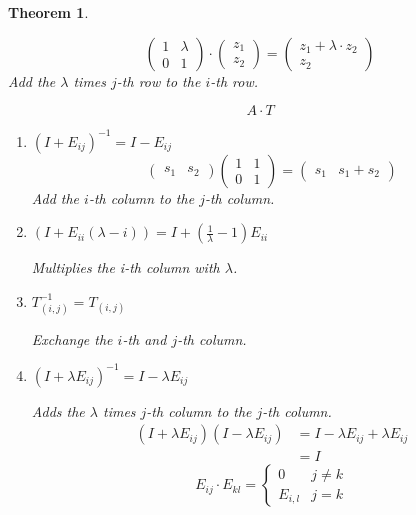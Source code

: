 \documentclass[a4paper,landscape,twocolumn]{article}
\newtheorem{theorem}{Theorem}[section]
\begin{document}
\begin{theorem}
\begin{enumerate}
      \[
        \begin{pmatrix}
          1 & \lambda \\
          0 & 1
        \end{pmatrix} \cdot
        \begin{pmatrix}
          z_1 \\
          z_2
        \end{pmatrix}
        =
        \begin{pmatrix}
          z_1 + \lambda \cdot z_2 \\
          z_2
        \end{pmatrix}
      \]
      Add the $\lambda$ times $j$-th row to the $i$-th row.
  \end{enumerate}
  \[ A \cdot T \]
  \begin{enumerate}
    \item $(I + E_{ij})^{-1} = I - E_{ij}$
      \[
        \begin{pmatrix}
          s_1 & s_2
        \end{pmatrix}
        \begin{pmatrix}
          1 & 1 \\
          0 & 1
        \end{pmatrix}
        =
        \begin{pmatrix}
          s_1 & s_1 + s_2
        \end{pmatrix}
      \]
      Add the $i$-th column to the $j$-th column.
    \item $(I + E_{ii}(\lambda - i)) = I + \left(\frac{1}{\lambda} - 1\right) E_{ii}$

      Multiplies the i-th column with $\lambda$.
    \item $T_{(i,j)}^{-1} = T_{(i,j)}$

      Exchange the $i$-th and $j$-th column.
    \item $(I + \lambda E_{ij})^{-1} = I - \lambda E_{ij}$

      Adds the $\lambda$ times $j$-th column to the $j$-th column.
      \begin{align*}
        (I + \lambda E_{ij}) (I - \lambda E_{ij})
          &= I - \lambda E_{ij} + \lambda E_{ij} \\
          &= I
      \end{align*}
      \[
        E_{ij} \cdot E_{kl} = \begin{cases}
          0 & j \neq k \\
          E_{i,l} & j = k
        \end{cases}
      \]
  \end{enumerate}
\end{theorem}
\end{document}
